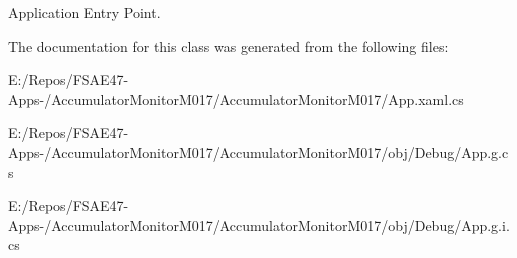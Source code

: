 Application Entry Point. 



The documentation for this class was generated from the following files\+:\begin{DoxyCompactItemize}
\item 
E\+:/\+Repos/\+F\+S\+A\+E47-\/\+Apps-\//\+Accumulator\+Monitor\+M017/\+Accumulator\+Monitor\+M017/App.\+xaml.\+cs\item 
E\+:/\+Repos/\+F\+S\+A\+E47-\/\+Apps-\//\+Accumulator\+Monitor\+M017/\+Accumulator\+Monitor\+M017/obj/\+Debug/App.\+g.\+cs\item 
E\+:/\+Repos/\+F\+S\+A\+E47-\/\+Apps-\//\+Accumulator\+Monitor\+M017/\+Accumulator\+Monitor\+M017/obj/\+Debug/App.\+g.\+i.\+cs\end{DoxyCompactItemize}
